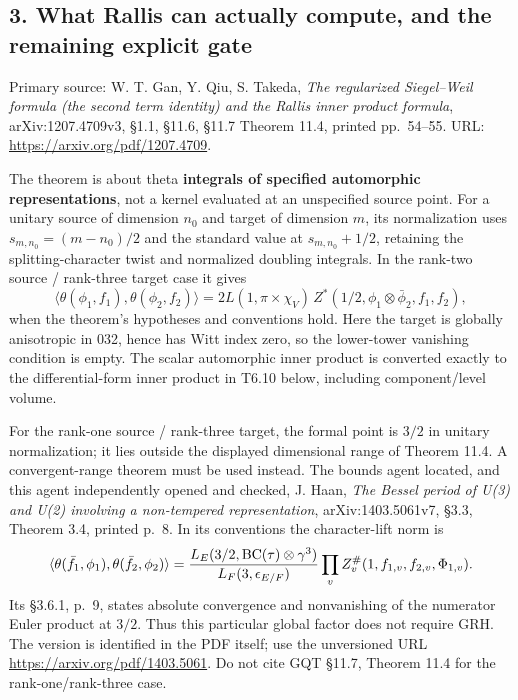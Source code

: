 \subsection{3. What Rallis can actually compute, and the remaining explicit gate}\label{what-rallis-can-actually-compute-and-the-remaining-explicit-gate}

Primary source: W. T. Gan, Y. Qiu, S. Takeda, \emph{The regularized Siegel--Weil formula (the second term identity) and the Rallis inner product formula}, arXiv:1207.4709v3, §1.1, §11.6, §11.7 Theorem 11.4, printed pp.~54--55. URL: \url{https://arxiv.org/pdf/1207.4709}.

The theorem is about theta \textbf{integrals of specified automorphic representations}, not a kernel evaluated at an unspecified source point. For a unitary source of dimension \(n_0\) and target of dimension \(m\), its normalization uses \(s_{m,n_0}=(m-n_0)/2\) and the standard value at \(s_{m,n_0}+1/2\), retaining the splitting-character twist and normalized doubling integrals. In the rank-two source / rank-three target case it gives \[
\langle\theta(\phi_1,f_1),\theta(\phi_2,f_2)\rangle
=2L(1,\pi\times\chi_V)\,Z^*(1/2,\phi_1\otimes\bar\phi_2,f_1,f_2),
\tag{R1}
\] when the theorem's hypotheses and conventions hold. Here the target is globally anisotropic in 032, hence has Witt index zero, so the lower-tower vanishing condition is empty. The scalar automorphic inner product is converted exactly to the differential-form inner product in T6.10 below, including component/level volume.

For the rank-one source / rank-three target, the formal point is \(3/2\) in unitary normalization; it lies outside the displayed dimensional range of Theorem 11.4. A convergent-range theorem must be used instead. The bounds agent located, and this agent independently opened and checked, J. Haan, \emph{The Bessel period of U(3) and U(2) involving a non-tempered representation}, arXiv:1403.5061v7, §3.3, Theorem 3.4, printed p.~8. In its conventions the character-lift norm is \[
\langle\theta(\bar f_1,\phi_1),\theta(\bar f_2,\phi_2)\rangle
={L_E(3/2,\mathrm{BC}(\tau)\otimes\gamma^3)\over L_F(3,\epsilon_{E/F})}
\prod_v Z_v^\#(1,f_{1,v},f_{2,v},\Phi_{1,v}).
\] Its §3.6.1, p.~9, states absolute convergence and nonvanishing of the numerator Euler product at \(3/2\). Thus this particular global factor does not require GRH. The version is identified in the PDF itself; use the unversioned URL \url{https://arxiv.org/pdf/1403.5061}. Do not cite GQT §11.7, Theorem 11.4 for the rank-one/rank-three case.

